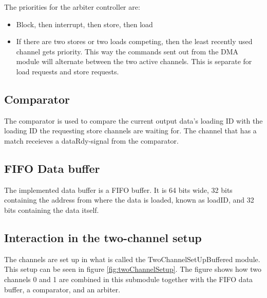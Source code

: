\begin{appendix}
The priorities for the arbiter controller are:
\begin{itemize}
    \item Block, then interrupt, then store, then load
    \item If there are two stores or two loads competing, then the least recently used channel gets priority.
    This way the commands sent out from the DMA module will alternate between the two active channels. 
    This is separate for load requests and store requests.
\end{itemize}

\subsection{Comparator}
The comparator is used to compare the current output data's loading ID with the loading ID the requesting store channels are waiting for.
The channel that has a match receieves a dataRdy-signal from the comparator. 

\subsection{FIFO Data buffer}
The implemented data buffer is a FIFO buffer.
It is 64 bits wide, 32 bits containing the address from where the data is loaded, known as loadID, and 32 bits containing the data itself.

\subsection{Interaction in the two-channel setup}
The channels are set up in what is called the TwoChannelSetUpBuffered module.
This setup can be seen in figure \ref{fig:twoChannelSetup}.
The figure shows how two channels 0 and 1 are combined in this submodule together with the FIFO data buffer, a comparator, and an arbiter.


\end{appendix}
